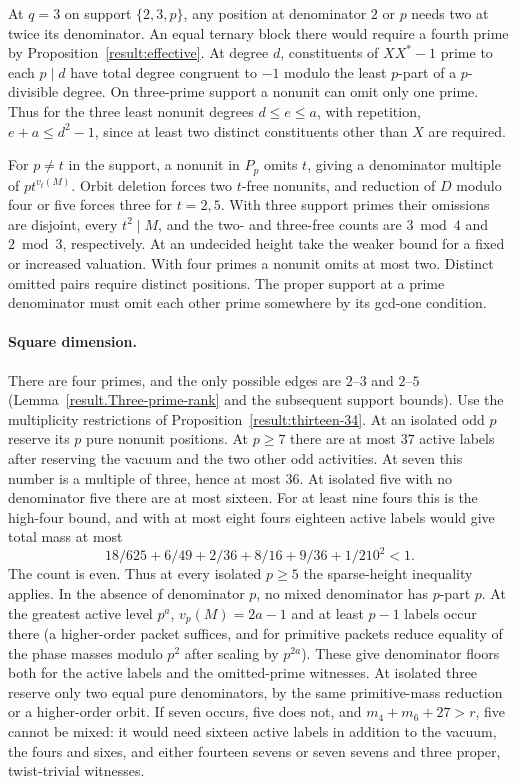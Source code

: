 \documentclass[11pt]{amsart}
\numberwithin{equation}{section}
\theoremstyle{definition}
\theoremstyle{plain}
\begin{document}
At $q=3$ on support $\{2,3,p\}$, any position at denominator $2$ or
$p$ needs two at twice its denominator. An equal ternary block there
would require a fourth prime by Proposition~\ref{result:effective}.
At degree $d$, constituents of $XX^*-1$ prime to each $p\mid d$
have total degree congruent to $-1$ modulo the least $p$-part of a
$p$-divisible degree. On three-prime support a nonunit can omit only
one prime. Thus for the three least nonunit degrees $d\le e\le a$,
with repetition, $e+a\le d^2-1$, since at least two distinct
constituents other than $X$ are required.

For $p\ne t$ in the support, a nonunit in $P_p$ omits $t$, giving a
denominator multiple of $pt^{v_t(M)}$. Orbit deletion forces two
$t$-free nonunits, and reduction of $D$ modulo four or five forces
three for $t=2,5$. With three support primes their omissions are
disjoint, every $t^2\mid M$, and the two- and three-free counts are
$3\bmod4$ and $2\bmod3$, respectively. At an undecided height take
the weaker bound for a fixed or increased valuation. With four
primes a nonunit omits at most two. Distinct omitted pairs require
distinct positions. The proper support at a prime denominator must
omit each other prime somewhere by its gcd-one condition.

\paragraph{Square dimension.}
There are four primes, and the only possible edges are $2$--$3$ and
$2$--$5$ (Lemma~\ref{result.Three-prime-rank} and the subsequent support
bounds). Use the multiplicity restrictions of Proposition~\ref{result:thirteen-34}. At an isolated odd $p$ reserve its $p$
pure nonunit positions. At $p\ge7$ there are at most $37$ active labels
after reserving the vacuum and the two other odd activities. At seven
this number is a multiple of three, hence at most $36$. At isolated
five with no denominator five there are at most sixteen. For at least
nine fours this is the high-four bound, and with at most eight fours
eighteen active labels would give total mass at most
\[
 18/625+6/49+2/36+8/16+9/36+1/210^2<1 .
\]
The count is even. Thus at every isolated $p\ge5$ the sparse-height
inequality applies. In the absence of denominator $p$, no mixed
denominator has $p$-part $p$.
At the greatest active level $p^a$, $v_p(M)=2a-1$ and at least
$p-1$ labels occur there (a higher-order packet suffices, and for
primitive packets reduce equality of the phase masses modulo $p^2$
after scaling by $p^{2a}$). These give denominator floors both for
the active labels and the omitted-prime witnesses. At isolated three reserve only two equal pure denominators, by the same
primitive-mass reduction or a higher-order orbit.
If seven occurs, five does not, and $m_4+m_6+27>r$, five cannot be
mixed: it would need sixteen active labels in addition to the vacuum,
the fours and sixes, and either fourteen sevens or seven sevens and
three proper, twist-trivial witnesses.
\end{document}
